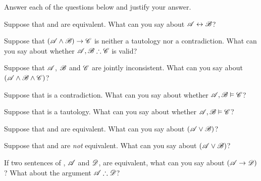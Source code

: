 \problempart
\label{pr.TT.concepts}
Answer each of the questions below and justify your answer.
\begin{earg}
\item Suppose that  and  are equivalent. What can you say about $\mathscr{A}\leftrightarrow\mathscr{B}$?
\item Suppose that $(\mathscr{A}\wedge\mathscr{B})\rightarrow\mathscr{C}$ is neither a tautology nor a contradiction. What can you say about whether $\mathscr{A}, \mathscr{B} \mathrel{\therefore}\mathscr{C}$ is valid?
\item Suppose that $\mathscr{A}$, $\mathscr{B}$ and $\mathscr{C}$  are jointly inconsistent. What can you say about $(\mathscr{A}\wedge\mathscr{B}\wedge\mathscr{C})$?
\item Suppose that  is a contradiction. What can you say about whether $\mathscr{A}, \mathscr{B} \vDash \mathscr{C}$?
\item Suppose that  is a tautology. What can you say about whether $\mathscr{A}, \mathscr{B}\vDash \mathscr{C}$?
\item Suppose that  and  are equivalent. What can you say about $(\mathscr{A}\vee\mathscr{B})$?
\item Suppose that  and  are \emph{not} equivalent. What can you say about $(\mathscr{A}\vee\mathscr{B})$?
\end{earg}

\problempart 
If two sentences of \TFL, $\mathscr{A}$ and $\mathscr{D}$, are equivalent, what can you say about $(\mathscr{A}\rightarrow \mathscr{D})$? What about the argument $\mathscr{A}\mathrel{\therefore} \mathscr{D}$?

